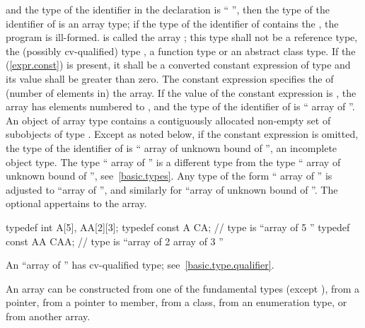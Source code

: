and the type of the identifier in the declaration
is
``
'',
then the type of the identifier of
is an array type; if the type of the identifier of 
contains the  ,
the program is ill-formed.
is called the array
;
this type shall not be a reference type, the (possibly cv-qualified) type
,
a function type or an abstract class type.
%
If the
(\ref{expr.const}) is present, it shall be a converted constant
expression of type  and
its value shall be greater than zero.
The constant expression specifies the
%
%
of (number of elements in) the array.
If the value of the constant expression is
,
the array has
elements numbered
to
,
and the type of the identifier of
is `` array of
''.
An object of array type contains a contiguously allocated non-empty set of
subobjects of type
.
Except as noted below, if
the constant expression is omitted, the type of the identifier of
is `` array of unknown bound of
'',
an incomplete object type.
The type `` array of
''
is a different type from the type
`` array of unknown bound of
'',
see~\ref{basic.types}.
Any type of the form
`` array of
''
is adjusted to
``array of
'',
and similarly for
``array of unknown bound of
''.
The optional  appertains to the array.
\enterexample

\begin{codeblock}
typedef int A[5], AA[2][3];
typedef const A CA;             // type is ``array of 5 ''
typedef const AA CAA;           // type is ``array of 2 array of 3 ''
\end{codeblock}
\exitexample
\enternote
An
``array of
''
has cv-qualified type; see~\ref{basic.type.qualifier}.
\exitnote

\pnum
An array can be constructed from one of the fundamental types
(except
),
from a pointer,
from a pointer to member, from a class,
from an enumeration type,
or from another array.

